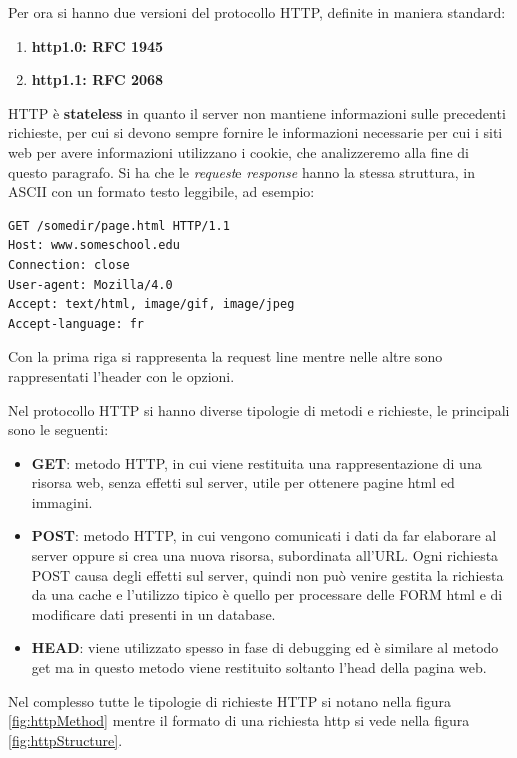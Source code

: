 \message{ !name(sd.tex)}\documentclass[a4paper,12pt, oneside]{book}
\begin{document}
Per ora si hanno due versioni del protocollo HTTP, definite in maniera standard:
\begin{enumerate}
	\item\textbf{ http1.0: RFC 1945}
	\item\textbf{ http1.1: RFC 2068}
\end{enumerate}
HTTP è \textbf{stateless} in quanto il server non mantiene informazioni sulle precedenti richieste,
per cui si devono sempre fornire le informazioni necessarie per cui i siti web per avere informazioni 
utilizzano i cookie, che analizzeremo alla fine di questo paragrafo.\newline
Si ha che le \textit{request}e \textit{response} hanno la stessa struttura, in ASCII con un 
formato testo leggibile, ad esempio:
\begin{verbatim}
GET /somedir/page.html HTTP/1.1
Host: www.someschool.edu
Connection: close
User-agent: Mozilla/4.0
Accept: text/html, image/gif, image/jpeg
Accept-language: fr
\end{verbatim}
Con la prima riga si rappresenta la request line mentre nelle altre sono rappresentati l'header con le opzioni.

Nel protocollo HTTP si hanno diverse tipologie di metodi e richieste, le principali sono le seguenti:
\begin{itemize}
	\item \textbf{GET}: metodo HTTP, in cui viene restituita una rappresentazione di una risorsa web,
        senza effetti sul server, utile per ottenere pagine html ed immagini.

    \item \textbf{POST}: metodo HTTP, in cui vengono comunicati i dati da far elaborare al server oppure
        si crea una nuova risorsa, subordinata all'URL.\newline
        Ogni richiesta POST causa degli effetti sul server, quindi non può venire gestita la richiesta da 
        una cache e l'utilizzo tipico è quello per processare delle FORM html e di modificare 
        dati presenti in un database.
    
    \item \textbf{HEAD}: viene utilizzato spesso in fase di debugging ed è similare al metodo get
        ma in questo metodo viene restituito soltanto l'head della pagina web.
\end{itemize}
Nel complesso tutte le tipologie di richieste HTTP si notano nella figura \ref{fig:httpMethod} mentre 
il formato di una richiesta http si vede nella figura \ref{fig:httpStructure}.
\end{document}
